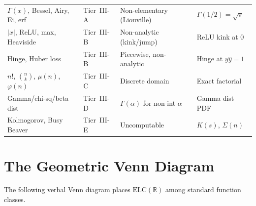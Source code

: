 \documentclass[12pt,a4paper]{article}
\theoremstyle{definition}
\newcommand{\ELC}{\mathrm{ELC}(\mathbb{R})}
\begin{document}
\begin{longtable}{@{}p{3.6cm}p{2.8cm}p{3.8cm}p{3.2cm}@{}}
$\Gamma(x)$, Bessel, Airy, Ei, erf & Tier~III-A & Non-elementary (Liouville) & $\Gamma(1/2)=\sqrt{\pi}$ \\
\rowcolor{outsidered}
$|x|$, ReLU, max, Heaviside & Tier~III-B & Non-analytic (kink/jump) & ReLU kink at 0 \\
\rowcolor{outsidered}
Hinge, Huber loss & Tier~III-B & Piecewise, non-analytic & Hinge at $y\hat y=1$ \\
\rowcolor{outsidered}
$n!$, $\binom{n}{k}$, $\mu(n)$, $\varphi(n)$ & Tier~III-C & Discrete domain & Exact factorial \\
\rowcolor{outsidered}
Gamma/chi-sq/beta dist & Tier~III-D & $\Gamma(\alpha)$ for non-int $\alpha$ & Gamma dist PDF \\
\rowcolor{outsidered}
Kolmogorov, Busy Beaver & Tier~III-E & Uncomputable & $K(s)$, $\Sigma(n)$ \\
\end{longtable}

\section{The Geometric Venn Diagram}
\label{sec:venn}

The following verbal Venn diagram places $\ELC$ among standard function classes.
\end{document}
